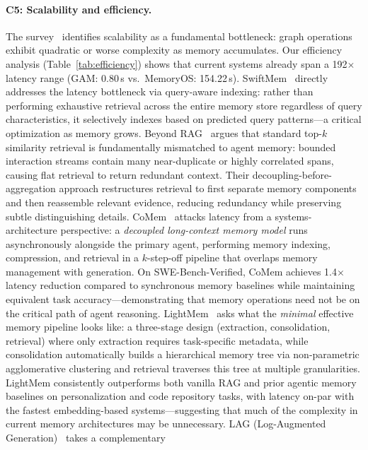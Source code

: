 \documentclass[hf]{ceurart}
\begin{document}
\paragraph{C5: Scalability and efficiency.}
The survey~\cite{graphmemsurvey2026} identifies scalability as a
fundamental bottleneck: graph operations exhibit quadratic or worse
complexity as memory accumulates. Our efficiency analysis
(Table~\ref{tab:efficiency}) shows that current systems already span
a 192$\times$ latency range (GAM: 0.80\,s vs.\ MemoryOS: 154.22\,s).
SwiftMem~\cite{swiftmem2026} directly addresses the latency bottleneck
via query-aware indexing: rather than performing exhaustive retrieval
across the entire memory store regardless of query characteristics,
it selectively indexes based on predicted query patterns---a critical
optimization as memory grows.
Beyond RAG~\cite{beyondrag2026} argues that standard top-$k$
similarity retrieval is fundamentally mismatched to agent memory:
bounded interaction streams contain many near-duplicate or highly
correlated spans, causing flat retrieval to return redundant context.
Their decoupling-before-aggregation approach restructures retrieval
to first separate memory components and then reassemble relevant
evidence, reducing redundancy while preserving subtle distinguishing
details.
CoMem~\cite{comem2026} attacks latency from a systems-architecture
perspective: a \emph{decoupled long-context memory model} runs
asynchronously alongside the primary agent, performing memory
indexing, compression, and retrieval in a $k$-step-off pipeline
that overlaps memory management with generation. On
SWE-Bench-Verified, CoMem achieves 1.4$\times$ latency reduction
compared to synchronous memory baselines while maintaining
equivalent task accuracy---demonstrating that memory operations
need not be on the critical path of agent reasoning.
LightMem~\cite{lightmem2026} asks what the \emph{minimal} effective
memory pipeline looks like: a three-stage design (extraction,
consolidation, retrieval) where only extraction requires
task-specific metadata, while consolidation automatically builds a
hierarchical memory tree via non-parametric agglomerative clustering
and retrieval traverses this tree at multiple granularities.
LightMem consistently outperforms both vanilla RAG and prior agentic
memory baselines on personalization and code repository tasks, with
latency on-par with the fastest embedding-based systems---suggesting
that much of the complexity in current memory architectures may be
unnecessary.
LAG (Log-Augmented Generation)~\cite{lag2026} takes a complementary
\end{document}
